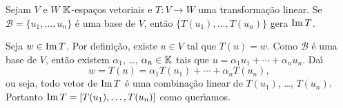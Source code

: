 \begin{lema}\label{transformacao_gera_imagem}
  Sejam $V$ e $W$ $\mathbb{K}$-espa\c{c}os vetoriais e $T \colon V \to W$ uma transforma\c{c}\~ao linear. Se $\mathcal{B} = \{u_1, \dots, u_n\}$ \'e uma base de $V$, ent\~ao $\{T(u_1), \dots, T(u_n)\}$ gera ${\rm Im\,} T$.
\end{lema}
\begin{prova}
  Seja $w \in {\rm Im\,} T$. Por defini\c{c}\~ao, existe $u \in V$ tal que $T(u) = w$. Como $\mathcal{B}$ \'e uma base de $V$, ent\~ao existem $\alpha_1$, \dots, $\alpha_n \in \mathbb{K}$ tais que $u = \alpha_1u_1 + \cdots + \alpha_nu_n$. Da{\'\i}
  \[
    w = T(u) = \alpha_1T(u_1) + \cdots + \alpha_nT(u_n),
  \]
  ou seja, todo vetor de ${\rm Im\,} T$ \'e uma combina\c{c}\~ao linear de $T(u_1)$, \dots, $T(u_n)$. Portanto ${\rm Im\,} T = [T(u_1), \dots, T(u_n)]$ como quer{\'\i}amos.
\end{prova}


